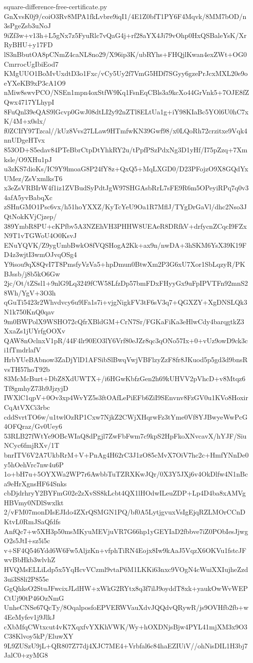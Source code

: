 \documentclass[11pt]{article}
\theoremstyle{definition}
\theoremstyle{remark}
\begin{document}
\begin{filecontents*}[overwrite]{square-difference-free-certificate.py}
GnXvsK0j9/coiO3Rv8MPA1fkLvbre9iqI1/4E1Z0bfT1PY6F4Mqvk/8MM7bOD/n3sPgeZsb3uNoJ
9iZf3w+v13h+L5gNx7z5FyuRlc7vQaG4j+rf28aYX4Ji79vOhp0HxQSBaleYsK/XrRyBHU+y17FD
lS3nBbutOA8pCNmZ4caNL8no29/X96ip3K/ubRYhs+FHQjlKwan4exZWt+OG0CmrrocUgIbiEod7
KMgUUO1BoMvUxdtD3o1Fxc/vCy5Uy2f7VmG5HDf7SGyy6gzePrJcxMXL20e9oeYXeKB9xP3cA1O9
nMiw8swvPCO/NSEn1mpn4oxStfW9Kq1FsnEqCBls3a9kcXo44GrVnk5+7OJE8fZQwx4717YLhypI
8FuQnl39eQAS9lGcvp0GwJ08dtLI2y92nZTl8ELtUa1g+iY98KIaBc5YOl6U0hC7xK/4M+x0slx/
f0ZCIfY97Tzcal//kUz8Vvs27LLaw9HTmfwKN39Gwf98/x0LQoRh72crzitxe9Vqk4nnUDgeHTvx
853OD+S5edav84PTeBbrCtpDtYhkRY2u/tPpfPSzPdxNg3D1yHf/I75pZzq+7Xmksle/O9XHu1pJ
u3zKS7dioKs/IC9Y9lmoaG8P24fY8z+QxQ5+MqLXGD0/D23PFojzO9X8GQdYxUMez/ZsVxmlksT6
x3eZsVRBIrW4f1iz1ZVBudSyPdtJgW97SHGAsbRrL7sFE9R6m5OPeyiRPq7q0v34afA5yvBabqXc
zSHnGMO1Psc6vx/h51hoYXXZ/KyTcYeU9Oa1R7MflJ/TYgDrGaVl/dhc2Nso3JQtNokKVjCjzep/
389YmbR8PU+cKPfbv5A3NZEhVH3PHHW8UEAeR8DRfkV+drfycnZCqcI9FZxN9T1vTGWoU4O0KsvJ
ENuYQVK/Z9ygUmbBwkO8fVQSHogA2Kk+ax9n/nwDA+3hSKM6YsX39K19FD4z3wjtI3wmOJvqOSg4
Y9isou9qX8QvI7T8PmsfyVzVa5+hpDmun0BtwXm2P3G6xU7Xor1SbLqzyR/PKBJssb/j8b5kO6Gw
2jc/Ot/tZSsl1+9nlG9Lq3249fCW58LfzDp57bmFDxFHyyGx9uFpIPVTFn92mnS28Wh/YgV+3O3h
qGuTi5423r2Whvdvcy6u9lFa1s7i+vjgNigkFV3tF6sV3q7+QGXZY+XgDNSLQk3N1k750KnQ0qav
9m0BWPolX9WSHO72cQfrXBldGM+CrN7Sr/FGKaFiKa3eHlwCdy4barqgtkZ3XxaZs1jUYrfgOOXv
QAW8nOclnxV1pR/44F4lr90EO3lY6Vrf80eJZr8qc3qONo57Ix+0+vUz9owD9ck3ci1fTmdrlafV
HrbYUeBAbnow3ZaDjYlD1AFSibSlBwqVwjVBFlzyZzF8fr8JKuod5p5gd3d9bnsRvsTH57hoT92b
83McMcBurt+DbZ8XdUWTX+/i6HGwKbfzGen2h69kUHVV2pVhcD+v8Mtqz6Tf8gmhyZ73b9JjzyjD
IWXlC1qpV+0Ov3xp4WvYZ5s3ftOAfLePiEFb6ZiI9SEnvnv8FzGV0u1KVo8HoxirCqAtVXCi3rbc
cddSvrtTO6w/u1twlOzRP1Cxw7NjkZ2CWjXHqrwFz3tYme0Vf8YJBwyeWwPcG4OFQraz/Gv0Uey6
53RLB27fWtYe9OBcWIaQ8dPgjl7ZwFbFwm7c9kpS2HpFkoXNvcavX/hYJF/SiuNCyc6fmjRXv/1T
bnrITV6V2A7UkbRrM+V+PnAg4H62rC3J1zO85cMvX7OiV7hc2c+HmfYNnDe0y5hOehVrc7nw4u6P
1o+bH7u+5OYXWa2WP7r6AwbbTuTZRXKwJQr/0X3Y5JXj6v4OkDlfw4N1nBca9eHrXgnsHF64Snks
cbDjdrhryY2BYFmG02e2zXvSS8kLcbt4QX1lHOdwILeuZDP+Lp4D4ba8xAMVgHBVmy0NDlSwxlkt
2/vFM07monDIsEJIdo4ZXrQSMGN1PQ/bf0A5LytjgvuxVsIgEjqRZLMOrCCnDKtvL0RmJSaQfdfs
AnfQc7+w5XH3p50msMKyuMEVjuVR7G66hp1yGEYIaD2fbbve7iZ0PObIesJjwgO2s5JtI+sz5i5c
v+SF4Q546Ydd6W6Fw5AljzKn+vfphTiRN4Eojx8Iw9kAaJ5VqzX6OKVu1fstcJFwvBbHkb3wlvhZ
HVQMsELLiLdp5x5YqHcvVCzml9vtaP6M1LKKi63nxc9VOgN4cWuiXXIujheZzd3ui3S8li2P855e
GgQhksO2StuJFwcixJLdHW+xWkG2RYtx8q3f7ilJ9oyddT8xk+yaukOwWvWEPCtUj90tP46OzNmG
UnheCNSe67QcTy/8OqalposfoEPVERWVauXdvJQQdvQRywR/js9OVHfb2fb+w4EeMyfev1j9JlkJ
cXbMfqCWtxcut4vK7XqxfvYXKhVWK/Wy+hOXDNjsBjw4PYL41mjXM3x9O3C38Klvoy5kP/EluwXY
9L9ZUSzU9jL+QR807Z77dj4XJC7ME4+Vrbfal6c84haEZIUiV//ohNisDIL1H3bj7JalC0+zyMG8

\end{filecontents*}
\end{document}
